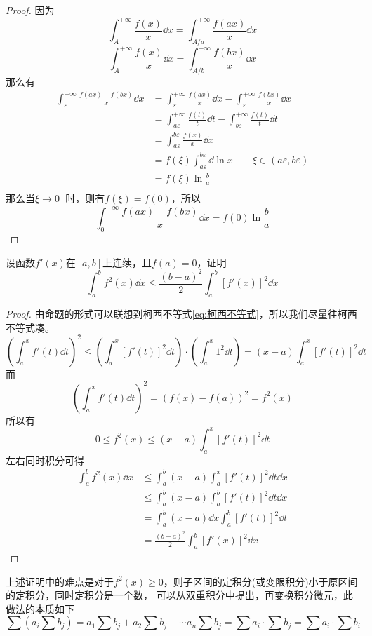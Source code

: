 \begin{proof}
    因为
    \[ \int_A^{+\infty}\frac{f(x)}{x}\dd{x} = \int_{A/a}^{+\infty} \frac{f(ax)}{x}\dd{x} \]
    \[ \int_A^{+\infty}\frac{f(x)}{x}\dd{x} = \int_{A/b}^{+\infty} \frac{f(bx)}{x}\dd{x} \]
    那么有
    \begin{align*}
        \int_\varepsilon^{+\infty} \frac{f(ax)-f(bx)}{x}\dd{x}
         & = \int_\varepsilon^{+\infty} \frac{f(ax)}{x}\dd{x} - \int_\varepsilon^{+\infty}\frac{f(bx)}{x}\dd{x}     \\
         & = \int_{a\varepsilon}^{+\infty} \frac{f(t)}{t}\dd{t} - \int_{b\varepsilon}^{+\infty}\frac{f(t)}{t}\dd{t} \\
         & = \int_{a\varepsilon}^{b\varepsilon} \frac{f(x)}{x}\dd{x}                                                \\
         & = f(\xi)\int_{a\varepsilon}^{b\varepsilon} \dd{\ln x} \qquad \xi\in(a\varepsilon,b\varepsilon)           \\
         & = f(\xi)\ln\frac{b}{a} \qquad                                                                            \\
    \end{align*}
    那么当$\xi\to 0^+$时，则有$f(\xi)=f(0)$，所以
    \[
        \int_0^{+\infty}\frac{f(ax)-f(bx)}{x}\dd{x} = f(0)\ln\frac{b}{a}
    \]
\end{proof}

\begin{example}
    设函数$f'(x)$在$[a,b]$上连续，且$f(a)=0$，证明
    \[ \int_a^b f^2(x)\dd{x} \leq \frac{(b-a)^2}{2}\int_a^b[f'(x)]^2\dd{x} \]
\end{example}
\begin{proof}
    由命题的形式可以联想到柯西不等式\ref{eq:柯西不等式}，所以我们尽量往柯西不等式凑。
    \[
        \left(\int_a^x f'(t)\dd{t}\right)^2
        \leq
        \left(\int_a^x [f'(t)]^2\dd{t}\right)\cdot\left(\int_a^x 1^2\dd{t}\right)
        =
        (x-a)\int_a^x [f'(t)]^2\dd{t}
    \]
    而
    \[ \left(\int_a^x f'(t)\dd{t}\right)^2 = \left(f(x)-f(a)\right)^2 = f^2(x) \]
    所以有
    \[ 0 \leq f^2(x) \leq (x-a)\int_a^x [f'(t)]^2\dd{t} \]
    左右同时积分可得
    \begin{align*}
        \int_a^b f^2(x)\dd{x}
         & \leq
        \int_a^b (x-a)\int_a^x [f'(t)]^2\dd{t}\dd{x}  \\
         & \leq
        \int_a^b (x-a)\int_a^b [f'(t)]^2\dd{t}\dd{x}  \\
         & =
        \int_a^b (x-a)\dd{x} \int_a^b [f'(t)]^2\dd{t} \\
         & =
        \frac{(b-a)^2}{2} \int_a^b [f'(x)]^2\dd{x}
    \end{align*}
\end{proof}
上述证明中的难点是对于$f^2(x)\geq 0$，则子区间的定积分(或变限积分)小于原区间的定积分，同时定积分是一个数，
可以从双重积分中提出，再变换积分微元，此做法的本质如下
\[ \sum \left(a_i\sum b_j\right) = a_1\sum b_j + a_2\sum b_j + \cdots a_n\sum b_j = \sum a_i\cdot\sum b_j = \sum a_i\cdot\sum b_i \]


